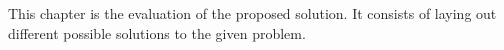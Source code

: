 This chapter is the evaluation of the proposed solution. It consists of laying out different possible solutions to the given problem.

